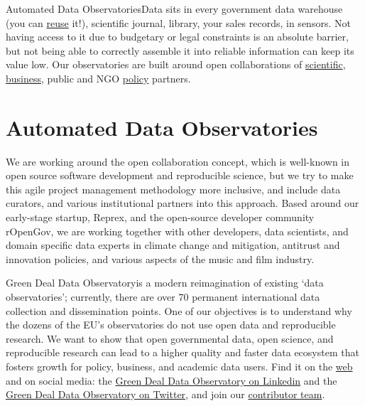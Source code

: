 \documentclass[
  a4paper,
  openany, a4paper, oneside]{book}
\begin{document}
Automated Data ObservatoriesData sits in every government data warehouse (you can \protect\hyperlink{open-data}{reuse} it!), scientific journal, library, your sales records, in sensors. Not having access to it due to budgetary or legal constraints is an absolute barrier, but not being able to correctly assemble it into reliable information can keep its value low. Our observatories are built around open collaborations of \protect\hyperlink{intro-academic-partners}{scientific}, \protect\hyperlink{intro-business-partners}{business}, public and NGO \protect\hyperlink{intro-policy-partners}{policy} partners.

\hypertarget{data-observatory}{%
\section*{Automated Data Observatories}\label{data-observatory}}

We are working around the open collaboration concept, which is well-known in open source software development and reproducible science, but we try to make this agile project management methodology more inclusive, and include data curators, and various institutional partners into this approach. Based around our early-stage startup, Reprex, and the open-source developer community rOpenGov, we are working together with other developers, data scientists, and domain specific data experts in climate change and mitigation, antitrust and innovation policies, and various aspects of the music and film industry.

Green Deal Data Observatoryis a modern reimagination of existing `data observatories'; currently, there are over 70 permanent international data collection and dissemination points. One of our objectives is to understand why the dozens of the EU's observatories do not use open data and reproducible research. We want to show that open governmental data, open science, and reproducible research can lead to a higher quality and faster data ecosystem that fosters growth for policy, business, and academic data users. Find it on the \href{https://greendeal.dataobservatory.eu/}{web} and on social media: the \href{https://www.linkedin.com/company/78556699}{Green Deal Data Observatory on Linkedin} and the \href{https://twitter.com/GreenDealObs}{Green Deal Data Observatory on Twitter}, and join our \href{https://greendeal.dataobservatory.eu/\#contributors}{contributor team}.
\end{document}
